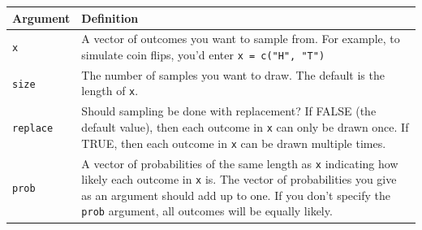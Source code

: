 \documentclass[]{book}
\theoremstyle{definition}
\theoremstyle{definition}
\theoremstyle{remark}
\begin{document}
\begin{longtable}[]{@{}ll@{}}
\toprule
\begin{minipage}[b]{0.14\columnwidth}\raggedright\strut
Argument\strut
\end{minipage} & \begin{minipage}[b]{0.61\columnwidth}\raggedright\strut
Definition\strut
\end{minipage}\tabularnewline
\midrule
\endhead
\begin{minipage}[t]{0.14\columnwidth}\raggedright\strut
\texttt{x}\strut
\end{minipage} & \begin{minipage}[t]{0.61\columnwidth}\raggedright\strut
A vector of outcomes you want to sample from. For example, to simulate
coin flips, you'd enter \texttt{x\ =\ c("H",\ "T")}\strut
\end{minipage}\tabularnewline
\begin{minipage}[t]{0.14\columnwidth}\raggedright\strut
\texttt{size}\strut
\end{minipage} & \begin{minipage}[t]{0.61\columnwidth}\raggedright\strut
The number of samples you want to draw. The default is the length of
\texttt{x}.\strut
\end{minipage}\tabularnewline
\begin{minipage}[t]{0.14\columnwidth}\raggedright\strut
\texttt{replace}\strut
\end{minipage} & \begin{minipage}[t]{0.61\columnwidth}\raggedright\strut
Should sampling be done with replacement? If FALSE (the default value),
then each outcome in \texttt{x} can only be drawn once. If TRUE, then
each outcome in \texttt{x} can be drawn multiple times.\strut
\end{minipage}\tabularnewline
\begin{minipage}[t]{0.14\columnwidth}\raggedright\strut
\texttt{prob}\strut
\end{minipage} & \begin{minipage}[t]{0.61\columnwidth}\raggedright\strut
A vector of probabilities of the same length as \texttt{x} indicating
how likely each outcome in \texttt{x} is. The vector of probabilities
you give as an argument should add up to one. If you don't specify the
\texttt{prob} argument, all outcomes will be equally likely.\strut
\end{minipage}\tabularnewline
\bottomrule
\end{longtable}
\end{document}
